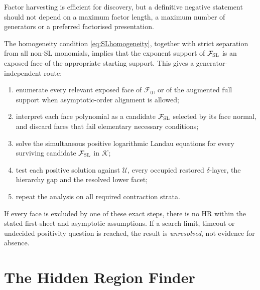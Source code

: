 \documentclass[a4paper,11pt]{article}
\newcommand{\K}{\mathcal K}
\newcommand{\FSL}{\mathcal F_{\rm SL}}
\begin{document}
Factor harvesting is efficient for discovery, but a definitive negative
statement should not depend on a maximum factor length, a maximum number of
generators or a preferred factorised presentation.

The homogeneity condition \eqref{eq:SLhomogeneity}, together with strict
separation from all non-SL monomials, implies that the exponent support of
\(\FSL\) is an exposed face of the appropriate starting support.  This gives
a generator-independent route:
\begin{enumerate}[label=\arabic*.]
\item enumerate every relevant exposed face of \(\mathcal F_0\), or of the
      augmented full support when asymptotic-order alignment is allowed;
\item interpret each face polynomial as a candidate \(\FSL\) selected by
      its face normal, and discard faces that fail elementary necessary
      conditions;
\item solve the simultaneous positive logarithmic Landau equations for every
      surviving candidate \(\FSL\) in \(\K\);
\item test each positive solution against \(\mathcal U\), every occupied
      restored \(\delta\)-layer, the hierarchy gap and the resolved lower
      facet;
\item repeat the analysis on all required contraction strata.
\end{enumerate}

If every face is excluded by one of these exact steps, there is no HR within
the stated first-sheet and asymptotic assumptions.  If a search limit,
timeout or undecided positivity question is reached, the result is
\emph{unresolved}, not evidence for absence.

\section{The Hidden Region Finder}
\label{sec:workflow}
\end{document}
